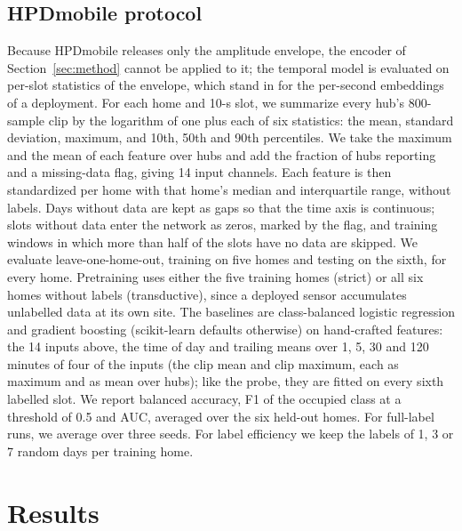 \documentclass[11pt]{article}
\begin{document}
\subsection{HPDmobile protocol}
\label{sec:hpd-protocol}
Because HPDmobile releases only the amplitude envelope, the encoder of Section~\ref{sec:method} cannot be applied to it; the temporal model is evaluated on per-slot statistics of the envelope, which stand in for the per-second embeddings of a deployment. For each home and 10-s slot, we summarize every hub's 800-sample clip by the logarithm of one plus each of six statistics: the mean, standard deviation, maximum, and 10th, 50th and 90th percentiles. We take the maximum and the mean of each feature over hubs and add the fraction of hubs reporting and a missing-data flag, giving 14 input channels. Each feature is then standardized per home with that home's median and interquartile range, without labels. Days without data are kept as gaps so that the time axis is continuous; slots without data enter the network as zeros, marked by the flag, and training windows in which more than half of the slots have no data are skipped. We evaluate leave-one-home-out, training on five homes and testing on the sixth, for every home. Pretraining uses either the five training homes (strict) or all six homes without labels (transductive), since a deployed sensor accumulates unlabelled data at its own site. The baselines are class-balanced logistic regression and gradient boosting (scikit-learn defaults otherwise) on hand-crafted features: the 14 inputs above, the time of day and trailing means over 1, 5, 30 and 120 minutes of four of the inputs (the clip mean and clip maximum, each as maximum and as mean over hubs); like the probe, they are fitted on every sixth labelled slot. We report balanced accuracy, F1 of the occupied class at a threshold of 0.5 and AUC, averaged over the six held-out homes. For full-label runs, we average over three seeds. For label efficiency we keep the labels of 1, 3 or 7 random days per training home.

\section{Results}
\label{sec:results}
\end{document}
